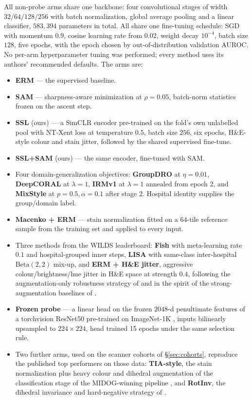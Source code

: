 \documentclass[10pt]{article} %
\begin{document}
All non-probe arms share one backbone: four convolutional stages of width
$32/64/128/256$ with batch normalization, global average pooling and a linear
classifier, $583{,}394$ parameters in total. All share one fine-tuning
schedule: SGD with momentum $0.9$, cosine learning rate from $0.02$, weight
decay $10^{-4}$, batch size $128$, five epochs, with the epoch chosen by
out-of-distribution validation AUROC. No per-arm hyperparameter tuning was
performed; every method uses its authors' recommended defaults. The arms are:

\begin{itemize}
\item \textbf{ERM} --- the supervised baseline.
\item \textbf{SAM} --- sharpness-aware minimization \citep{foret2021sam} at
$\rho=0.05$, batch-norm statistics frozen on the ascent step.
\item \textbf{SSL} (ours) --- a SimCLR encoder \citep{chen2020simclr}
pre-trained on the fold's own unlabelled pool with NT-Xent loss at temperature
$0.5$, batch size $256$, six epochs, H\&E-style colour and stain jitter,
followed by the shared supervised fine-tune.
\item \textbf{SSL+SAM} (ours) --- the same encoder, fine-tuned with SAM.
\item Four domain-generalization objectives: \textbf{GroupDRO}
\citep{sagawa2020groupdro} at $\eta=0.01$, \textbf{DeepCORAL}
\citep{sun2016coral} at $\lambda=1$, \textbf{IRMv1} \citep{arjovsky2019irm} at
$\lambda=1$ annealed from epoch 2, and \textbf{MixStyle}
\citep{zhou2021mixstyle} at $p=0.5,\alpha=0.1$ after stage 2. Hospital identity
supplies the group/domain label.
\item \textbf{Macenko + ERM} --- stain normalization \citep{macenko2009} fitted
on a 64-tile reference sample from the training set and applied to every input.
\item Three methods from the WILDS leaderboard: \textbf{Fish}
\citep{shi2022fish} with meta-learning rate $0.1$ and hospital-grouped inner
steps, \textbf{LISA} \citep{yao2022lisa} with same-class inter-hospital
$\mathrm{Beta}(2,2)$ mix-up, and \textbf{ERM + H\&E jitter}, aggressive
colour/brightness/hue jitter in H\&E space at strength $0.4$, following the
augmentation-only robustness strategy of \citet{tellez2019stain} and in the
spirit of the strong-augmentation baselines of \citet{taori2020robustness}.
\item \textbf{Frozen probe} --- a linear head on the frozen $2048$-d
penultimate features of a torchvision ResNet50 \citep{he2016resnet} pre-trained
on ImageNet-1K \citep{deng2009imagenet}, inputs bilinearly upsampled to
$224\times224$, head trained 15 epochs under the same selection rule.
\item Two further arms, used on the scanner cohorts of \S\ref{sec:cohorts},
reproduce the published top performers on those data: \textbf{TIA-style}, the
stain normalization plus heavy colour and dihedral augmentation of the
classification stage of the MIDOG-winning pipeline
\citep{jahanifar2024mitosis}, and \textbf{RotInv}, the dihedral invariance and
hard-negative strategy of \citet{lafarge2021rotation}.
\end{itemize}
\end{document}
